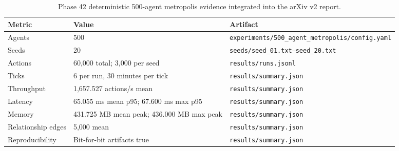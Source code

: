 \begin{table}[h]
\centering
\begin{tabular}{lll}
\toprule
Metric & Value & Artifact \\
\midrule
Agents & 500 & \texttt{experiments/500\_agent\_metropolis/config.yaml} \\
Seeds & 20 & \texttt{seeds/seed\_01.txt}--\texttt{seed\_20.txt} \\
Actions & 60,000 total; 3,000 per seed & \texttt{results/runs.jsonl} \\
Ticks & 6 per run, 30 minutes per tick & \texttt{results/summary.json} \\
Throughput & 1,657.527 actions/s mean & \texttt{results/summary.json} \\
Latency & 65.055 ms mean p95; 67.600 ms max p95 & \texttt{results/summary.json} \\
Memory & 431.725 MB mean peak; 436.000 MB max peak & \texttt{results/summary.json} \\
Relationship edges & 5,000 mean & \texttt{results/summary.json} \\
Reproducibility & Bit-for-bit artifacts true & \texttt{results/summary.json} \\
\bottomrule
\end{tabular}
\caption{Phase 42 deterministic 500-agent metropolis evidence integrated into the arXiv v2 report.}
\label{tab:metropolis-500-summary}
\end{table}
